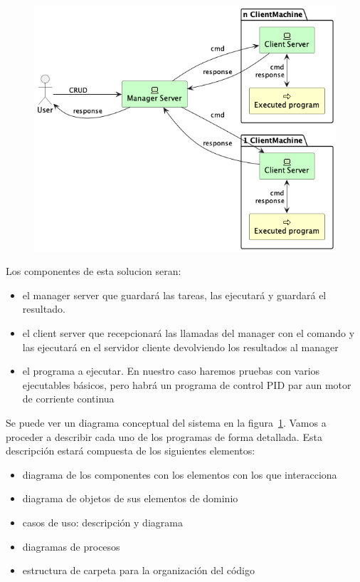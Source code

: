 
\begin{figure}[H]
    \centering
    \includegraphics[height=0.4\textheight]{part/memoria_descriptiva/systemConcept}
    \caption[]{}\label{fig:systemConcept}
\end{figure}

Los componentes de esta solucion seran:
\begin{itemize}
    \item el manager server que guardará las tareas, las ejecutará y guardará el resultado.
    \item el client server que recepcionará las llamadas del manager con el comando y las ejecutará en el servidor cliente devolviendo los resultados al manager
    \item el programa a ejecutar. En nuestro caso haremos pruebas con varios ejecutables básicos, pero habrá un programa de control PID par aun motor de corriente continua
\end{itemize}

Se puede ver un diagrama conceptual del sistema en la figura~\ref{fig:systemConcept}. Vamos a proceder a describir cada uno de los programas de forma detallada. Esta descripción estará compuesta de los siguientes elementos:

\begin{itemize}
    \item diagrama de los componentes con los elementos con los que interacciona
    \item diagrama de objetos de sus elementos de dominio
    \item casos de uso: descripción y diagrama
    \item diagramas de procesos
    \item estructura de carpeta para la organización del código
\end{itemize}

